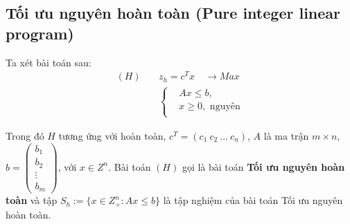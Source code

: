 \documentclass[12pt,a4paper]{report}
\begin{document}
\subsection*{Tối ưu nguyên hoàn toàn (Pure integer linear program)}
    Ta xét bài toán sau:
    \begin{equation} \label{H}
        \begin{split}
        (H) \quad & z_h=c^Tx \quad \longrightarrow Max \\
                  & \left\{\begin{split}
                    &Ax \leq  b, \\
                    &x \geq 0, \text{ nguyên} \\
                    \end{split}\right.    
        \end{split}
        \end{equation}            

    Trong đó $H$ tương ứng với hoàn toàn, $c^T=(c_1 \: c_2 \: \ldots \: c_n)$, $A$ là ma trận $m\times n$, $b=\begin{pmatrix}
        b_1 \\
        b_2 \\
        \vdots \\
        b_m
        \end{pmatrix}$, với $x\in Z^n$. Bài toán $(H)$ gọi là bài toán \textbf{Tối ưu nguyên hoàn toàn} và tập $S_h:=\{x\in Z^n_+: Ax\leq b\}$ là tập nghiệm của bài toán Tối ưu nguyên hoàn toàn.


\end{document}
